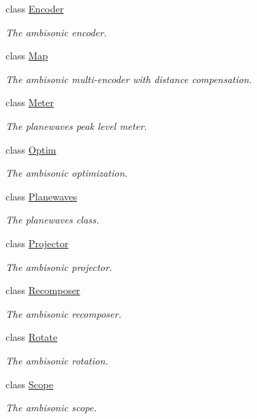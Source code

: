 \begin{DoxyCompactItemize}
class \hyperlink{class_hoa2_d_1_1_encoder}{Encoder}
\begin{DoxyCompactList}\small\item\em The ambisonic encoder. \end{DoxyCompactList}\item 
class \hyperlink{class_hoa2_d_1_1_map}{Map}
\begin{DoxyCompactList}\small\item\em The ambisonic multi-\/encoder with distance compensation. \end{DoxyCompactList}\item 
class \hyperlink{class_hoa2_d_1_1_meter}{Meter}
\begin{DoxyCompactList}\small\item\em The planewaves peak level meter. \end{DoxyCompactList}\item 
class \hyperlink{class_hoa2_d_1_1_optim}{Optim}
\begin{DoxyCompactList}\small\item\em The ambisonic optimization. \end{DoxyCompactList}\item 
class \hyperlink{class_hoa2_d_1_1_planewaves}{Planewaves}
\begin{DoxyCompactList}\small\item\em The planewaves class. \end{DoxyCompactList}\item 
class \hyperlink{class_hoa2_d_1_1_projector}{Projector}
\begin{DoxyCompactList}\small\item\em The ambisonic projector. \end{DoxyCompactList}\item 
class \hyperlink{class_hoa2_d_1_1_recomposer}{Recomposer}
\begin{DoxyCompactList}\small\item\em The ambisonic recomposer. \end{DoxyCompactList}\item 
class \hyperlink{class_hoa2_d_1_1_rotate}{Rotate}
\begin{DoxyCompactList}\small\item\em The ambisonic rotation. \end{DoxyCompactList}\item 
class \hyperlink{class_hoa2_d_1_1_scope}{Scope}
\begin{DoxyCompactList}\small\item\em The ambisonic scope. \end{DoxyCompactList}\item 

\end{DoxyCompactItemize}
